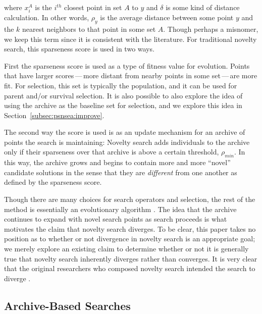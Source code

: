 \documentclass[twoside]{article}
\begin{document}
\noindent where $x^A_i$ is the $i^{th}$ closest point in set $A$ to $y$ and $\delta$ is some kind of distance calculation.  In other words, $\rho_y$ is the average distance between some point $y$ and the $k$ nearest neighbors to that point in some set $A$.  Though perhaps a misnomer, we keep this term since it is consistent with the literature.  For traditional novelty search, this sparseness score is used in two ways.  

First the sparseness score is used as a type of fitness value for evolution.  Points that have larger scores\,---\,more distant from nearby points in some set\,---\,are more fit.  For selection, this set is typically the population, and it can be used for parent and/or survival selection.  It is also possible to also explore the idea of using the archive as the baseline set for selection, and we explore this idea in Section~\ref{subsec:psnsea:improve}.

The second way the score is used is as an update mechanism for an archive of points the search is maintaining:  Novelty search adds individuals to the archive only if their sparseness over that archive is above a certain threshold, $\rho_{min}$.  In this way, the archive grows and begins to contain more and more ``novel'' candidate solutions in the sense that they are \emph{different} from one another as defined by the sparseness score.

Though there are many choices for search operators and selection, the rest of the method is essentially an evolutionary algorithm \citep{ec:DeJong2006}.  The idea that the archive continues to expand with novel search points as search proceeds is what motivates the claim that novelty search diverges.  To be clear, this paper takes no position as to whether or not divergence in novelty search is an appropriate goal; we merely explore an existing claim to determine whether or not it is generally true that novelty search inherently diverges rather than converges.  It is very clear that the original researchers who composed novelty search intended the search to diverge \citep{Lehman2016frai,Lehman2015gecco,StanleyLehman2015}.


\subsection{Archive-Based Searches}
\label{subsec:archive}
\end{document}
